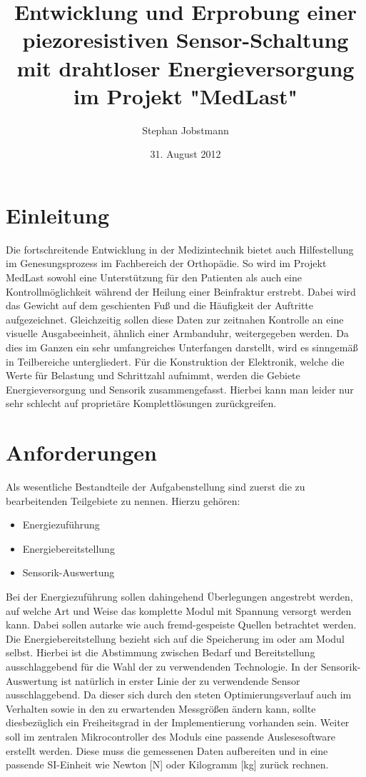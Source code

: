 \documentclass[11pt]{scrreprt} %
\title{Entwicklung und Erprobung einer piezoresistiven Sensor-Schaltung mit drahtloser Energieversorgung im Projekt "MedLast"}
\author{Stephan Jobstmann}
\date {31. August 2012}
\begin{document}
\maketitle
\setcounter {page}{1}
\tableofcontents
\listoffigures
\def\chapterpagestyle{fancy}
\chapter{Einleitung}
\setcounter {page}{1}
Die fortschreitende Entwicklung in der Medizintechnik bietet auch Hilfestellung im Genesungsprozess im Fachbereich der Orthopädie. So wird im Projekt MedLast sowohl eine Unterstützung für den Patienten als auch eine Kontrollmöglichkeit während der Heilung einer Beinfraktur erstrebt. Dabei wird das Gewicht auf dem geschienten Fuß und die Häufigkeit der Auftritte aufgezeichnet. Gleichzeitig sollen diese Daten zur zeitnahen Kontrolle an eine visuelle Ausgabeeinheit, ähnlich einer Armbanduhr, weitergegeben werden. Da dies im Ganzen ein sehr umfangreiches Unterfangen darstellt, wird es sinngemäß in Teilbereiche untergliedert. Für die Konstruktion der Elektronik, welche die Werte für Belastung und Schrittzahl aufnimmt, werden die Gebiete Energieversorgung und Sensorik zusammengefasst. Hierbei kann man leider nur sehr schlecht auf proprietäre Komplettlösungen zurückgreifen. 
\chapter{Anforderungen}
Als wesentliche Bestandteile der Aufgabenstellung sind zuerst die zu bearbeitenden Teilgebiete zu nennen. Hierzu gehören:
\begin{itemize}
\item
Energiezuführung
\item
Energiebereitstellung
\item
Sensorik-Auswertung
\end{itemize}
Bei der Energiezuführung sollen dahingehend Überlegungen angestrebt werden, auf welche Art und Weise das komplette Modul mit Spannung versorgt werden kann. Dabei sollen autarke wie auch fremd-gespeiste Quellen betrachtet werden. Die Energiebereitstellung bezieht sich auf die Speicherung im oder am Modul selbst. Hierbei ist die Abstimmung zwischen Bedarf und Bereitstellung ausschlaggebend für die Wahl der zu verwendenden Technologie. In der Sensorik-Auswertung ist natürlich in erster Linie der zu verwendende Sensor ausschlaggebend. Da dieser sich durch den steten Optimierungsverlauf auch im Verhalten sowie in den zu erwartenden Messgrößen ändern kann, sollte diesbezüglich ein Freiheitsgrad in der Implementierung vorhanden sein. Weiter soll im zentralen Mikrocontroller des Moduls eine passende Auslesesoftware erstellt werden. Diese muss die gemessenen Daten aufbereiten und in eine passende SI-Einheit wie Newton [N] oder Kilogramm [kg] zurück rechnen. 
\end{document}
